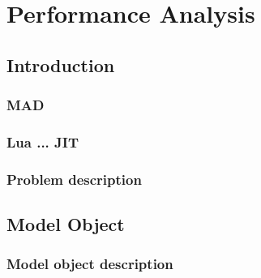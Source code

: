 \documentclass[12pt, oneside]{Thesis}
\begin{document}




\mainmatter
\pagestyle{fancy}

\part{Performance Analysis}
\label{Part:mad}

  \chapter{Introduction}
  \label{Chapt:Intro}

    \section{MAD}
    \label{Sec:mad}
    

    \section{Lua ... JIT}
    \label{Sec:LuaJIT}
    

    \section{Problem description}
    \label{Sec:Problem-description}
    

  \chapter{Model Object}
  \label{Chapt:MO}
  

    \section{Model object description}
    \label{Sec:MO-descriptinon}
    
\end{document}

